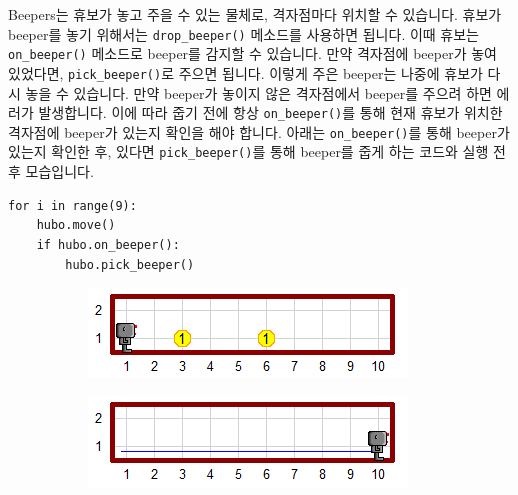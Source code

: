 \documentclass[../main.tex]{subfiles}
\begin{document}
Beepers는 휴보가 놓고 주을 수 있는 물체로, 격자점마다 위치할 수 있습니다.
휴보가 beeper를 놓기 위해서는 \texttt{drop\_beeper()} 메소드를 사용하면 됩니다.
이때 휴보는 \texttt{on\_beeper()} 메소드로 beeper를 감지할 수 있습니다.
만약 격자점에 beeper가 놓여 있었다면, \texttt{pick\_beeper()}로 주으면 됩니다.
이렇게 주은 beeper는 나중에 휴보가 다시 놓을 수 있습니다.
만약 beeper가 놓이지 않은 격자점에서 beeper를 주으려 하면 에러가 발생합니다.
이에 따라 줍기 전에 항상 \texttt{on\_beeper()}를 통해 현재 휴보가 위치한 격자점에 beeper가 있는지 확인을 해야 합니다.
아래는 \texttt{on\_beeper()}를 통해 beeper가 있는지 확인한 후, 있다면 \texttt{pick\_beeper()}를 통해 beeper를 줍게 하는 코드와 실행 전후 모습입니다.
\begin{verbatim}
for i in range(9):
    hubo.move()
    if hubo.on_beeper():
        hubo.pick_beeper()
\end{verbatim}
\begin{figure}[H]
\centering
\begin{subfigure}{.5\textwidth}
\centering
\includegraphics[width=.9\linewidth]{"./lectures/lecture5_pickbeeperbef"}
\label{fig:lecture5pickbeeperbef}
\end{subfigure}%
\begin{subfigure}{.5\textwidth}
\centering
\includegraphics[width=.9\linewidth]{"./lectures/lecture5_pickbeeperaft"}
\label{fig:lecture5pickbeeperaft}
\end{subfigure}
\end{figure}
\end{document}
